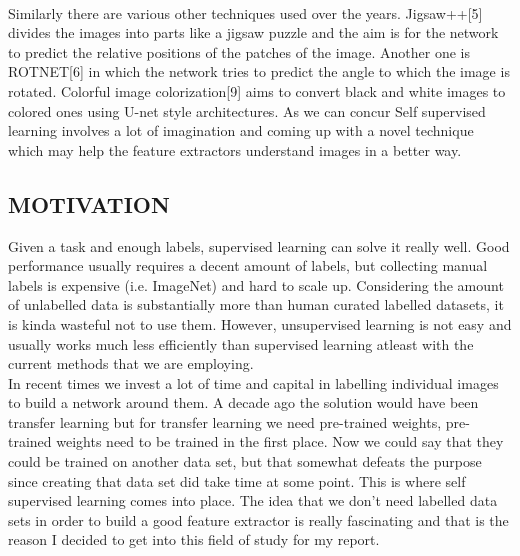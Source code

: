 \documentclass[a4paper, 12pt]{article}
\begin{document}
\\

\par
Similarly there are various other techniques used over the years. Jigsaw++[5] divides the images into parts like a jigsaw puzzle and the aim is for the network to predict the relative positions of the patches of the image. Another one is ROTNET[6] in which the network tries to predict the angle to which the image is rotated. Colorful image colorization[9] aims to convert black and white images to colored ones using U-net style architectures. As we can concur Self supervised learning involves a lot of imagination and coming up with a novel technique which may help the feature extractors understand images in a better way.
\\

\par


\newpage
\begin{center}

\section{MOTIVATION}

\end{center}
\hspace{1cm} 
Given a task and enough labels, supervised learning can solve it really well. Good performance usually requires a decent amount of labels, but collecting manual labels is expensive (i.e. ImageNet) and hard to scale up. Considering the amount of unlabelled data is substantially more than human curated labelled datasets, it is kinda wasteful not to use them. However, unsupervised learning is not easy and usually works much less efficiently than supervised learning atleast with the current methods that we are employing.
\\

\hspace{1cm}
In recent times we invest a lot of time and capital in labelling individual images to build a network around them. A decade ago the solution would have been transfer learning but for transfer learning we need pre-trained weights, pre-trained weights need to be trained in the first place. Now we could say that they could be trained on another data set, but that somewhat defeats the purpose since creating that data set did take time at some point. This is where self supervised learning comes into place. The idea that we don't need labelled data sets in order to build a good feature extractor is really fascinating and that is the reason I decided to get into this field of study for my report.
\\
\end{document}

